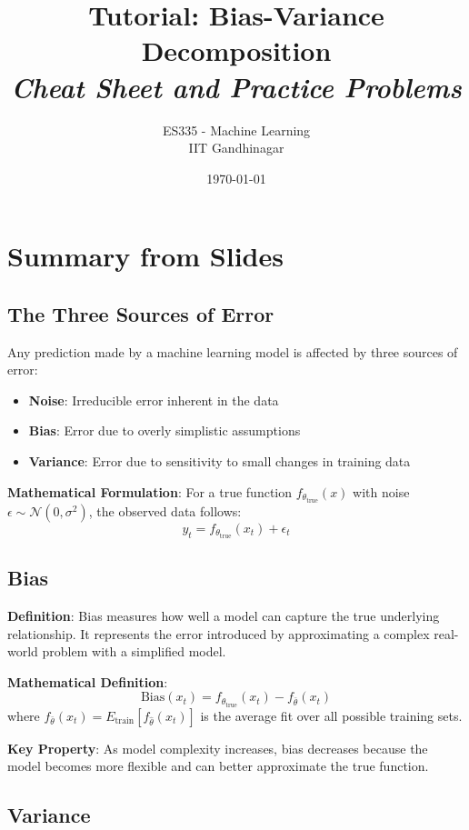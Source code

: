 \documentclass{article}
\title{\textbf{Tutorial: Bias-Variance Decomposition} \\ \textit{Cheat Sheet and Practice Problems}}
\author{ES335 - Machine Learning \\ IIT Gandhinagar}
\date{\today}
\begin{document}
\maketitle

\section{Summary from Slides}

\subsection{The Three Sources of Error}

Any prediction made by a machine learning model is affected by three sources of error:
\begin{itemize}
    \item \textbf{Noise}: Irreducible error inherent in the data
    \item \textbf{Bias}: Error due to overly simplistic assumptions
    \item \textbf{Variance}: Error due to sensitivity to small changes in training data
\end{itemize}

\textbf{Mathematical Formulation}: For a true function $f_{\theta_{\text{true}}}(x)$ with noise $\epsilon \sim \mathcal{N}(0, \sigma^2)$, the observed data follows:
$$y_t = f_{\theta_{\text{true}}}(x_t) + \epsilon_t$$

\subsection{Bias}

\textbf{Definition}: Bias measures how well a model can capture the true underlying relationship. It represents the error introduced by approximating a complex real-world problem with a simplified model.

\textbf{Mathematical Definition}:
$$\text{Bias}(x_t) = f_{\theta_{\text{true}}}(x_t) - f_{\bar{\theta}}(x_t)$$
where $f_{\bar{\theta}}(x_t) = E_{\text{train}}[f_{\hat{\theta}}(x_t)]$ is the average fit over all possible training sets.

\textbf{Key Property}: As model complexity increases, bias decreases because the model becomes more flexible and can better approximate the true function.

\subsection{Variance}
\end{document}
